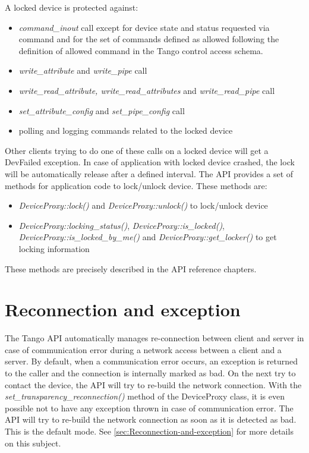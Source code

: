 A locked device is protected against:
\begin{itemize}
\item \emph{command\_inout} call except for device state and status requested
via command and for the set of commands defined as allowed following
the definition of allowed command in the Tango control access schema.
\item \emph{write\_attribute} and \emph{write\_pipe} call
\item \emph{write\_read\_attribute, write\_read\_attributes} and \emph{write\_read\_pipe}
call
\item \emph{set\_attribute\_config }and\emph{ set\_pipe\_config} call
\item polling and logging commands related to the locked device
\end{itemize}
Other clients trying to do one of these calls on a locked device will
get a DevFailed exception. In case of application with locked device
crashed, the lock will be automatically release after a defined interval.
The API provides a set of methods for application code to lock/unlock
device. These methods are:
\begin{itemize}
\item \emph{DeviceProxy::lock()} and \emph{DeviceProxy::unlock()} to lock/unlock
device
\item \emph{DeviceProxy::locking\_status()}, \emph{DeviceProxy::is\_locked()},
\emph{DeviceProxy::is\_locked\_by\_me()} and \emph{DeviceProxy::get\_locker()}
to get locking information
\end{itemize}
These methods are precisely described in the API reference chapters.


\section{Reconnection and exception}

The Tango API automatically manages re-connection between client and
server in case of communication error during a network access between
a client and a server. By default, when a communication error occurs,
an exception is returned to the caller and the connection is internally
marked as bad. On the next try to contact the device, the API will
try to re-build the network connection. With the \emph{set\_transparency\_reconnection()}
method of the DeviceProxy class, it is even possible
not to have any exception thrown in case of communication error. The
API will try to re-build the network connection as soon as it is detected
as bad. This is the default mode. See \ref{sec:Reconnection-and-exception}
for more details on this subject.


